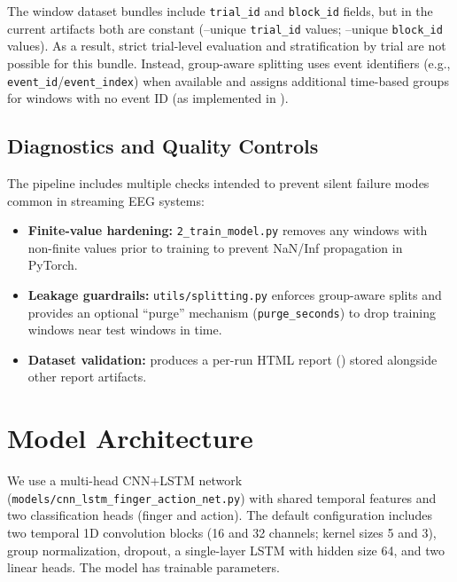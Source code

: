\documentclass[conference]{IEEEtran}
\begin{document}
The window dataset bundles include \texttt{trial\_id} and \texttt{block\_id} fields, but in the current artifacts both are constant (\TrialIdUniqueMin--\TrialIdUniqueMax unique \texttt{trial\_id} values; \BlockIdUniqueMin--\BlockIdUniqueMax unique \texttt{block\_id} values). As a result, strict trial-level evaluation and stratification by trial are not possible for this bundle. Instead, group-aware splitting uses event identifiers (e.g., \texttt{event\_id}/\texttt{event\_index}) when available and assigns additional time-based groups for windows with no event ID (as implemented in ).

\subsection{Diagnostics and Quality Controls}
The pipeline includes multiple checks intended to prevent silent failure modes common in streaming EEG systems:
\begin{itemize}
\item \textbf{Finite-value hardening:} \texttt{2\_train\_model.py} removes any windows with non-finite values prior to training to prevent NaN/Inf propagation in PyTorch.
\item \textbf{Leakage guardrails:} \texttt{utils/splitting.py} enforces group-aware splits and provides an optional ``purge'' mechanism (\texttt{purge\_seconds}) to drop training windows near test windows in time.
\item \textbf{Dataset validation:}  produces a per-run HTML report () stored alongside other report artifacts.
\end{itemize}

\section{Model Architecture}

We use a multi-head CNN+LSTM network (\texttt{models/cnn\_lstm\_finger\_action\_net.py}) with shared temporal features and two classification heads (finger and action). The default configuration includes two temporal 1D convolution blocks (16 and 32 channels; kernel sizes 5 and 3), group normalization, dropout, a single-layer LSTM with hidden size 64, and two linear heads. The model has \ModelParamCount trainable parameters.
\end{document}
